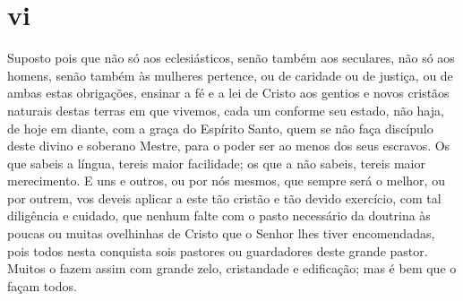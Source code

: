 \section*{vi}

Suposto pois que não só aos eclesiásticos, senão também aos seculares,
não só aos homens, senão também às mulheres pertence, ou de caridade ou
de justiça, ou de ambas estas obrigações, ensinar a fé e a lei de Cristo
aos gentios e novos
cristãos naturais destas terras em que vivemos, cada um conforme seu
estado, não haja, de hoje em diante, com a graça do Espírito Santo, quem
se não faça discípulo deste divino e soberano Mestre, para o poder ser
ao menos dos seus escravos. Os que sabeis a língua, tereis maior
facilidade; os que a não sabeis, tereis maior merecimento. E uns e
outros, ou por nós mesmos, que sempre será o melhor, ou por
outrem, vos deveis aplicar a este tão cristão e tão devido exercício,
com tal diligência e cuidado, que nenhum falte com o pasto necessário da
doutrina às poucas ou muitas ovelhinhas de Cristo que o Senhor lhes
tiver encomendadas, pois todos nesta conquista sois pastores ou
guardadores deste grande pastor. Muitos o fazem assim com grande zelo,
cristandade e edificação; mas é bem que o façam todos.

